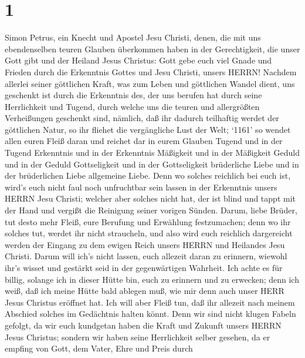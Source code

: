 \hypertarget{section}{%
\section{1}\label{section}}

 Simon Petrus, ein Knecht und Apostel Jesu Christi, denen,
die mit uns ebendenselben teuren Glauben überkommen haben in der
Gerechtigkeit, die unser Gott gibt und der Heiland Jesus Christus:
 Gott gebe euch viel Gnade und Frieden durch die Erkenntnis
Gottes und Jesu Christi, unsers HERRN!  Nachdem allerlei
seiner göttlichen Kraft, was zum Leben und göttlichen Wandel dient, uns
geschenkt ist durch die Erkenntnis des, der uns berufen hat durch seine
Herrlichkeit und Tugend,  durch welche uns die teuren und
allergrößten Verheißungen geschenkt sind, nämlich, daß ihr dadurch
teilhaftig werdet der göttlichen Natur, so ihr fliehet die vergängliche
Lust der Welt;  `1161' so wendet allen euren Fleiß daran und
reichet dar in eurem Glauben Tugend und in der Tugend Erkenntnis
 und in der Erkenntnis Mäßigkeit und in der Mäßigkeit Geduld
und in der Geduld Gottseligkeit  und in der Gottseligkeit
brüderliche Liebe und in der brüderlichen Liebe allgemeine Liebe.
 Denn wo solches reichlich bei euch ist, wird's euch nicht
faul noch unfruchtbar sein lassen in der Erkenntnis unsers HERRN Jesu
Christi;  welcher aber solches nicht hat, der ist blind und
tappt mit der Hand und vergißt die Reinigung seiner vorigen Sünden.
 Darum, liebe Brüder, tut desto mehr Fleiß, eure Berufung
und Erwählung festzumachen; denn wo ihr solches tut, werdet ihr nicht
straucheln,  und also wird euch reichlich dargereicht
werden der Eingang zu dem ewigen Reich unsers HERRN und Heilandes Jesu
Christi.  Darum will ich's nicht lassen, euch allezeit
daran zu erinnern, wiewohl ihr's wisset und gestärkt seid in der
gegenwärtigen Wahrheit.  Ich achte es für billig, solange
ich in dieser Hütte bin, euch zu erinnern und zu erwecken; 
denn ich weiß, daß ich meine Hütte bald ablegen muß, wie mir denn auch
unser HERR Jesus Christus eröffnet hat.  Ich will aber
Fleiß tun, daß ihr allezeit nach meinem Abschied solches im Gedächtnis
halten könnt.  Denn wir sind nicht klugen Fabeln gefolgt,
da wir euch kundgetan haben die Kraft und Zukunft unsers HERRN Jesus
Christus; sondern wir haben seine Herrlichkeit selber gesehen,
 da er empfing von Gott, dem Vater, Ehre und Preis durch
